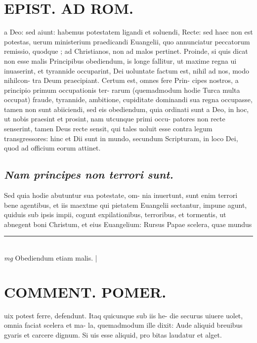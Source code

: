 \documentclass{article}
\begin{document}
\begin{pages}
\section*{EPIST. AD ROM.  }
\marginpar{[ p.150 ]}\pstart a Deo: sed aiunt: habemus potestatem ligandi et soluendi, Recte: sed haec non est potestas, uerum ministerium praedicandi Euangelii, quo annunciatur peccatorum remissio, quodque ; ad Christianos, non ad malos pertinet. Proinde, si quis dicat non esse malis Principibus obediendum, is longe fallitur, ut maxime regna ui inuaserint, et tyrannide occuparint, Dei uoluntate factum est, nihil ad nos, modo nihilcon- tra Deum praecipiant. Certum est, omnes fere Prin- cipes nostros, a principio primum occupationis ter- rarum (quemadmodum hodie Turca multa occupat) fraude, tyrannide, ambitione, cupiditate dominandi sua regna occupasse, tamen non sunt abiiciendi, sed eis obediendum, quia ordinati sunt a Deo, in hoc, ut nobis praesint et prosint, nam utcunque primi occu- patores non recte senserint, tamen Deus recte sensit, qui tales uoluit esse contra legum transgressores: hinc et Dii sunt in mundo, secundum Scripturam, in loco Dei, quod ad officium eorum attinet.  \pend
{}
{}
\subsection*{\textit{Nam principes non terrori sunt. }}\pstart Sed quia hodie abutuntur sua potestate, om- nia inuertunt, sunt enim terrori bene agentibus, et iis maextme qui pietatem Euangelii sectantur, impune agunt, quiduis sub ipsis impii, cogunt expilationibus, terroribus, et tormentis, ut abnegent boni Christum, et eius Euangelium: Rursus Papae scelera, quae mundus  \pend
\vspace{0.5cm}\noindent
\vspace{0.2cm}\rule{1cm}{0.2pt}\\ 
\hspace{0.2cm}\textit{mg}
\footnotesize Obediendum etiam malis. 
\normalsize| 
\section*{COMMENT. POMER.  }\pstart uix potest ferre, defendunt. Itaq quicunque sub iis he- die securus uiuere uolet, omnia faciat scelera et ma- la, quemadmodum ille dixit: Aude aliquid breuibus gyaris et carcere dignum. Si uis esse aliquid, pro bitas laudatur et alget.  \pend
{}
{}

\end{pages}
\end{document}
